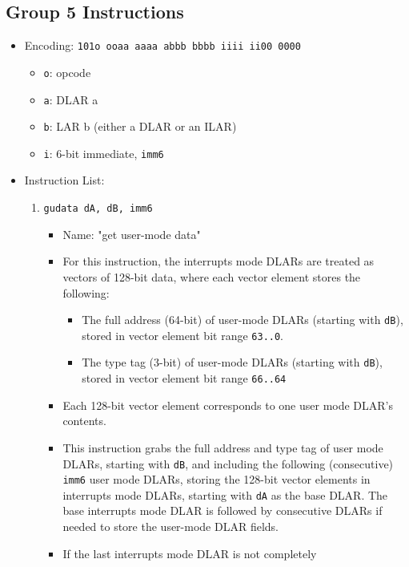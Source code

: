 \documentclass{article}
\begin{document}
	\subsection{Group 5 Instructions}
		\begin{itemize}
		\item Encoding:  \texttt{101o ooaa aaaa abbb  bbbb iiii ii00 0000}
			\begin{itemize}
			\item \texttt{o}:  opcode
			\item \texttt{a}:  DLAR a
			\item \texttt{b}:  LAR b (either a DLAR or an ILAR)
			\item \texttt{i}:  6-bit immediate, \texttt{imm6}
			\end{itemize}
		\item Instruction List:
			\begin{enumerate}
			\item \texttt{gudata dA, dB, imm6}
				\begin{itemize}
				\item Name:  "get user-mode data"
				\item For this instruction, the interrupts mode DLARs are
					treated as vectors of 128-bit data, where each vector
					element stores the following:
					\begin{itemize}
					\item The full address (64-bit) of user-mode DLARs
						(starting with \texttt{dB}), stored in vector
						element bit range \texttt{63..0}.
					\item The type tag (3-bit) of user-mode DLARs (starting
						with \texttt{dB}), stored in vector element bit
						range \texttt{66..64}
					\end{itemize}
				\item Each 128-bit vector element corresponds to one
					user mode DLAR's contents.
				\item This instruction grabs the full address and type tag
					of user mode DLARs, starting with \texttt{dB}, and
					including the following (consecutive) \texttt{imm6}
					user mode DLARs, storing the 128-bit vector elements in
					interrupts mode DLARs, starting with \texttt{dA} as the
					base DLAR.  The base interrupts mode DLAR is followed
					by consecutive DLARs if needed to store the user-mode
					DLAR fields.
				\item If the last interrupts mode DLAR is not completely

\end{itemize}
\end{enumerate}
\end{itemize}
\end{document}
